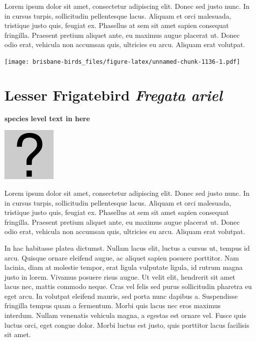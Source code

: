 \documentclass[]{book}
\let\origfigure\figure
\let\endorigfigure\endfigure
\renewenvironment{figure}[1][2] {
  \expandafter\origfigure\expandafter[H]
} {
  \endorigfigure
}
\begin{document}
Lorem ipsum dolor sit amet, consectetur adipiscing elit. Donec sed justo
nunc. In in cursus turpis, sollicitudin pellentesque lacus. Aliquam et
orci malesuada, tristique justo quis, feugiat ex. Phasellus at sem sit
amet sapien consequat fringilla. Praesent pretium aliquet ante, eu
maximus augue placerat ut. Donec odio erat, vehicula non accumsan quis,
ultricies eu arcu. Aliquam erat volutpat.

\texttt{[image: brisbane-birds\_files/figure-latex/unnamed-chunk-1136-1.pdf]}

\section{\texorpdfstring{Lesser Frigatebird \emph{Fregata
ariel}}{Lesser Frigatebird Fregata ariel}}\label{lesser-frigatebird-fregata-ariel}

\textbf{species level text in here}

\begin{figure}
\centering
\includegraphics{assets/missing.png}
\caption{No image for species}
\end{figure}

Lorem ipsum dolor sit amet, consectetur adipiscing elit. Donec sed justo
nunc. In in cursus turpis, sollicitudin pellentesque lacus. Aliquam et
orci malesuada, tristique justo quis, feugiat ex. Phasellus at sem sit
amet sapien consequat fringilla. Praesent pretium aliquet ante, eu
maximus augue placerat ut. Donec odio erat, vehicula non accumsan quis,
ultricies eu arcu. Aliquam erat volutpat.

In hac habitasse platea dictumst. Nullam lacus elit, luctus a cursus ut,
tempus id arcu. Quisque ornare eleifend augue, ac aliquet sapien posuere
porttitor. Nam lacinia, diam at molestie tempor, erat ligula vulputate
ligula, id rutrum magna justo in lorem. Vivamus posuere risus augue. Ut
velit elit, hendrerit sit amet lacus nec, mattis commodo neque. Cras vel
felis sed purus sollicitudin pharetra eu eget arcu. In volutpat eleifend
mauris, sed porta nunc dapibus a. Suspendisse fringilla tempus quam a
fermentum. Morbi quis lacus nec eros maximus interdum. Nullam venenatis
vehicula magna, a egestas est ornare vel. Fusce quis luctus orci, eget
congue dolor. Morbi luctus est justo, quis porttitor lacus facilisis sit
amet.
\end{document}
